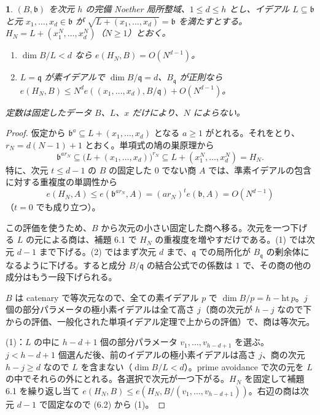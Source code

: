 \documentclass[11pt,a4paper]{ltjsarticle}
\newcommand{\stmtname}{}
\theoremstyle{plain}
\newtheorem*{stmtgen}{\stmtname}
\newenvironment{stmt}[1]{\renewcommand{\stmtname}{#1}\begin{stmtgen}}{\end{stmtgen}}
\theoremstyle{definition}
\newcommand{\bb}{\mathfrak{b}}
\begin{document}
\begin{stmt}{補題 6.2}
$(B,\bb)$ を次元 $h$ の完備 Noether 局所整域、$1\le d\le h$ とし、イデアル $L\subseteq\bb$ と元 $x_1,\dots,x_d\in\bb$ が $\sqrt{L+(x_1,\dots,x_d)} = \bb$ を満たすとする。$H_N = L+(x_1^N,\dots,x_d^N)$（$N\ge1$）とおく。
\begin{enumerate}
  \item $\dim B/L<d$ なら $e(H_N,B) = O(N^{d-1})$。
  \item $L = \mathfrak{q}$ が素イデアルで $\dim B/\mathfrak{q} = d$、$B_\mathfrak{q}$ が正則なら
  $e(H_N,B)\le N^de((x_1,\dots,x_d),B/\mathfrak{q})+O(N^{d-1})$。
\end{enumerate}
定数は固定したデータ $B$、$L$、$x$ だけにより、$N$ によらない。
\end{stmt}
\begin{proof}
仮定から $\bb^a\subseteq L+(x_1,\dots,x_d)$ となる $a\ge1$ がとれる。それをとり、$r_N = d(N-1)+1$ とおく。単項式の鳩の巣原理から
\begin{equation}\tag{6.1}
  \bb^{ar_N}\subseteq\bigl(L+(x_1,\dots,x_d)\bigr)^{r_N}\subseteq L+(x_1^N,\dots,x_d^N) = H_N.
\end{equation}
特に、次元 $t\le d-1$ の $B$ の固定した $0$ でない商 $A$ では、準素イデアルの包含に対する重複度の単調性から
\begin{equation}\tag{6.2}
  e(H_N,A)\le e(\bb^{ar_N},A) = (ar_N)^te(\bb,A) = O(N^{d-1})
\end{equation}
（$t = 0$ でも成り立つ）。

この評価を使うため、$B$ から次元の小さい固定した商へ移る。次元を一つ下げる $L$ の元による商は、補題 6.1 で $H_N$ の重複度を増やすだけである。(1) では次元 $d-1$ まで下げる。(2) ではまず次元 $d$ まで、$\mathfrak{q}$ での局所化が $B_\mathfrak{q}$ の剰余体になるように下げる。すると成分 $B/\mathfrak{q}$ の結合公式での係数は $1$ で、その商の他の成分はもう一段下げられる。

$B$ は catenary で等次元なので、全ての素イデアル $p$ で $\dim B/p = h-\mathrm{ht}\,p$。$j$ 個の部分パラメータの極小素イデアルは全て高さ $j$（商の次元が $h-j$ なので下からの評価、一般化された単項イデアル定理で上からの評価）で、商は等次元。

(1)：$L$ の中に $h-d+1$ 個の部分パラメータ $v_1,\dots,v_{h-d+1}$ を選ぶ。$j<h-d+1$ 個選んだ後、前のイデアルの極小素イデアルは高さ $j$、商の次元 $h-j\ge d$ なので $L$ を含まない（$\dim B/L<d$）。prime avoidance で次の元を $L$ の中でそれらの外にとれる。各選択で次元が一つ下がる。$H_N$ を固定して補題 6.1 を繰り返し当て
$e(H_N,B)\le e(H_N,B/(v_1,\dots,v_{h-d+1}))$。右辺の商は次元 $d-1$ で固定なので (6.2) から (1)。


\end{proof}
\end{document}
